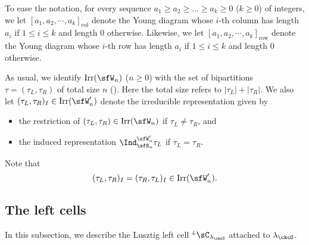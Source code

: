 \documentclass[12pt,a4paper]{amsart}
\def\abs#1{\left|{#1}\right|}
\numberwithin{equation}{section}
\theoremstyle{remark}
\def\Irr{\mathrm{Irr}}
\def\LC{{}^{\scriptscriptstyle L}\sC}
\begin{document}
 

To ease the notation, for every sequence $a_1\geq a_2\geq \dots \geq a_k\geq 0$ ($k\geq 0$) of integers,   we let $[a_1, a_2, \cdots, a_k]_{\mathrm{col}}$ denote the Young diagram
whose $i$-th column has length $a_i$ if $1 \leq i \leq k$ and length $0$
otherwise. Likewise, we let $[a_1, a_2, \cdots, a_k]_{\mathrm{row}}$ denote the Young diagram
whose $i$-th  row has length $a_i$ if $1 \leq i \leq k$ and length $0$ otherwise.

 As usual, we identify $\Irr(\sfW_{n})$ ($n\geq 0$) with the set of bipartitions $\tau =(\tau_{L},\tau_{R})$ of total size $n$ (\cite[Section 11.4]{Carter}). Here the total size refers to
$\abs{\tau_{L}}+\abs{\tau_{R}}$.
We also let $(\tau_{L},\tau_{R})_{I}\in \Irr(\sfW'_n)$ denote the  irreducible representation  given by
  \begin{itemize}
    \item the restriction of $(\tau_{L},\tau_{R})\in \Irr(\sfW_{n})$  if
    $\tau_{L}\neq \tau_{R}$, and
    \item
    the induced representation
    $\Ind_{\sfS_{n}}^{\sfW'_{n}} \tau_{L}$ if $\tau_{L}=\tau_{R}$.
  \end{itemize}
  Note that
  \[
    (\tau_{L},\tau_{R})_{I}=(\tau_{R},\tau_{L})_{I}\in \Irr(\sfW'_{n}).
  \]



  \subsection{The left cells}
  \label{sec:LCBCD}
  In this subsection, we describe the Lusztig left cell $\LC_{\lambda_{\ckcO}}$
  attached to $\lambda_{\ckcO}$. 
 
\end{document}
